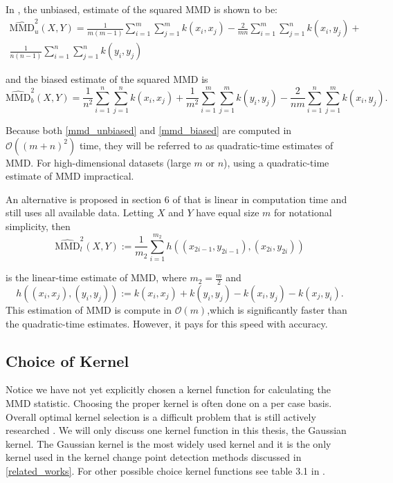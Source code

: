 In \cite{gretton2012kernel}, the unbiased, estimate of the squared MMD is shown to be:
\begin{equation}
\label{mmd_unbiased}
\begin{split}
\widehat{\text{MMD}}_{u}^{2}(X, Y)=\frac{1}{m(m-1)} \sum_{i=1}^m \sum_{ j=1}^{m} k\left(x_{i}, x_{j}\right)-\frac{2}{m n} \sum_{i=1}^m \sum_{ j=1}^{n} k\left(x_{i}, y_{j}\right)+ \\
\frac{1}{n(n-1)} \sum_{i=1}^n \sum_{j=1}^{n} k\left(y_{i}, y_{j}\right)
\end{split}
\end{equation}

and the biased estimate of the squared MMD is
\begin{equation}
\label{mmd_biased}
\widehat{\text{MMD}}_{b}^{2}(X, Y)= \frac{1}{n^{2}} \sum_{i=1}^{n} \sum_{j=1}^{n} k\left(x_{i}, x_{j}\right)+\frac{1}{m^{2}} \sum_{i=1}^{m} \sum_{j=1}^{m} k\left(y_{i}, y_{j}\right)-\frac{2}{n m} \sum_{i=1}^{n} \sum_{j=1}^{m} k\left(x_{i}, y_{j}\right).
\end{equation}

Because both \ref{mmd_unbiased} and \ref{mmd_biased} are computed in $\mathcal{O}((m + n)^2)$ time, they will be referred to as quadratic-time estimates of MMD. For high-dimensional datasets (large $m$ or $n$), using a quadratic-time estimate of MMD impractical. 

An alternative is proposed in section 6 of \cite{gretton2012kernel} that is linear in computation time and still uses all available data. Letting $X$ and $Y$ have equal size $m$ for notational simplicity, then
\begin{equation}
\label{mmd_linear}
\widehat{\text{MMD}}_{l}^{2}(X, Y) :=\frac{1}{m_{2}} \sum_{i=1}^{m_{2}} h\left(\left(x_{2 i-1}, y_{2 i-1}\right),\left(x_{2 i}, y_{2 i}\right)\right)
\end{equation}

is the linear-time estimate of MMD, where $m_2=\frac{m}{2}$ and
\begin{equation}
h\left((x_i, x_j), (y_i, y_j)\right):=k\left(x_{i}, x_{j}\right)+k\left(y_{i}, y_{j}\right)-k\left(x_{i}, y_{j}\right)-k\left(x_{j}, y_{i}\right).
\end{equation}
This estimation of MMD is compute in $\mathcal{O}(m)$,which is significantly faster than the quadratic-time estimates. However, it pays for this speed with accuracy.

\subsection{Choice of Kernel}
Notice we have not yet explicitly chosen a kernel function for calculating the MMD statistic. Choosing the proper kernel is often done on a per case basis. Overall optimal kernel selection is a difficult problem that is still actively researched \cite{gretton2012optimal}. We will only discuss one kernel function in this thesis, the Gaussian kernel. The Gaussian kernel is the most widely used kernel and it is the only kernel used in the kernel change point detection methods discussed in \ref{related_works}.  For other possible choice kernel functions see table 3.1 in \cite{muandet2017kernel}.

